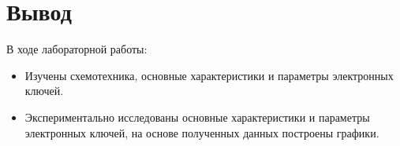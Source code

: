 \section{Вывод}
В ходе лабораторной работы:
\begin{itemize}

\item
Изучены схемотехника, основные характеристики и параметры электронных ключей.

\item
 Экспериментально исследованы основные характеристики и параметры электронных ключей, на основе полученных данных построены графики.

\end{itemize}
\clearpage
